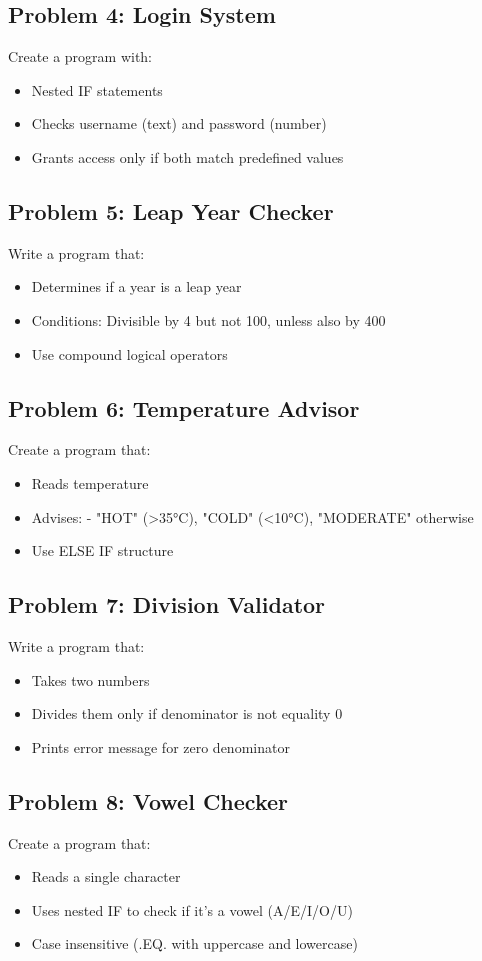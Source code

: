 \documentclass{book}
\begin{document}
\subsection*{Problem 4: Login System}  
Create a program with:  
\begin{itemize}  
\item Nested IF statements  
\item Checks username (text) and password (number)  
\item Grants access only if both match predefined values  
\end{itemize}

\subsection*{Problem 5: Leap Year Checker}  
Write a program that:  
\begin{itemize}  
\item Determines if a year is a leap year  
\item Conditions: Divisible by 4 but not 100, unless also by 400  
\item Use compound logical operators  
\end{itemize}

\subsection*{Problem 6: Temperature Advisor}  
Create a program that:  
\begin{itemize}  
\item Reads temperature  
\item Advises:  
  - "HOT" (>35°C), "COLD" (<10°C), "MODERATE" otherwise  
\item Use ELSE IF structure  
\end{itemize}

\subsection*{Problem 7: Division Validator}  
Write a program that:  
\begin{itemize}  
\item Takes two numbers  
\item Divides them only if denominator is not equality 0
\item Prints error message for zero denominator  
\end{itemize}

\subsection*{Problem 8: Vowel Checker}  
Create a program that:  
\begin{itemize}  
\item Reads a single character  
\item Uses nested IF to check if it's a vowel (A/E/I/O/U)  
\item Case insensitive (.EQ. with uppercase and lowercase)  
\end{itemize}
\end{document}
